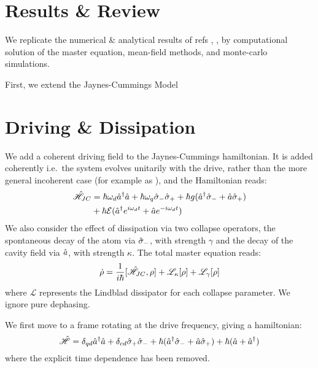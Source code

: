 
\section{Results \& Review}

We replicate the numerical \& analytical results of refs \cite{Carmichael2015}, \cite{Bishop2010}, by computational solution of the master equation, mean-field methods, and monte-carlo simulations.

First, we extend the Jaynes-Cummings Model

\section{Driving \& Dissipation}
We add a coherent driving field to the Jaynes-Cummings hamiltonian. It is added coherently i.e.\ the system evolves unitarily with the drive, rather than the more general incoherent case (for example as \cite{Xu2014}), and the Hamiltonian reads:
\begin{align}
    \hat{\mathscr{H}}_{JC} &= \hbar \omega_d \hat{a}^\dagger \hat{a} + \hbar \omega_q \hat{\sigma}_- \hat{\sigma}_+ +\hbar g (\hat{a}^\dagger \hat{\sigma}_-+ \hat{a} \hat{\sigma}_+)\\
    & + \hbar \mathcal{E} (\hat{a}^\dagger e^{i\omega_d t} + \hat{a} e^{-i\omega_d t})
\end{align}
We also consider the effect of dissipation via two collapse operators, the spontaneous decay of the atom via $\hat{\sigma}_-$, with strength $\gamma$ and the decay of the cavity field via $\hat{a}$, with strength $\kappa$. The total master equation reads:
\begin{equation}
  \dot{\rho} = \frac{1}{i\hbar}[\hat{\mathscr{H}}_{JC}, \rho] + \mathscr{L}_\kappa[\rho] + \mathscr{L}_\gamma[\rho]
\end{equation}
where $\mathscr{L}$ represents the Lindblad dissipator for each collapse parameter. 
We ignore pure dephasing.

We first move to a frame rotating at the drive frequency, giving a hamiltonian:
\begin{equation}
  \hat{\mathscr{H}} = \delta_{qd} \hat{a}^\dagger \hat{a} + \delta_{cd} \hat{\sigma}_+ \hat{\sigma}_- + \hbar (\hat{a}^\dagger \hat{\sigma}_- + \hat{a} \hat{\sigma}_+) + \hbar (\hat{a} + \hat{a}^\dagger)
\end{equation}
where the explicit time dependence has been removed.
